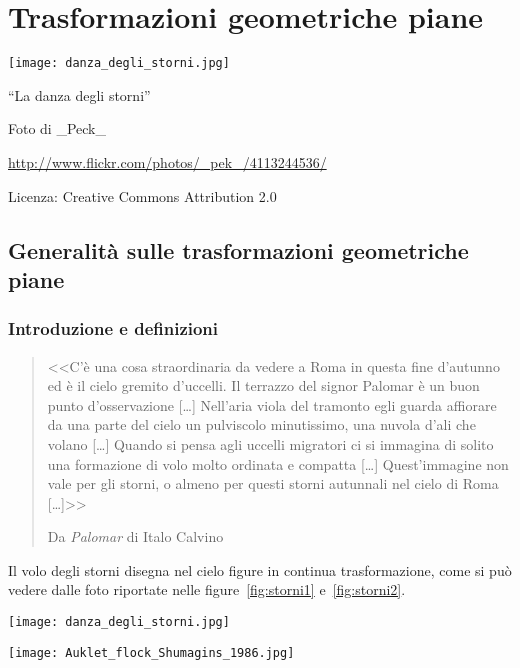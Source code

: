 
\chapter{Trasformazioni geometriche piane}\label{chap:trasformazioni}

\texttt{[image: danza\_degli\_storni.jpg]}
  \begin{center}
    {\large ``La danza degli storni''}\par
    Foto di \_Peck\_\par
    \url{http://www.flickr.com/photos/_pek_/4113244536/}\par
    Licenza: Creative Commons Attribution 2.0\par
  \end{center}
\newpage


\section{Generalità sulle trasformazioni geometriche piane}\label{sect:generalita_trasformazioni}

\subsection{Introduzione e definizioni}

\begin{quote}
<<C'è una cosa straordinaria da vedere a Roma in questa fine d'autunno ed è il cielo gremito d'uccelli. Il terrazzo del signor Palomar è un buon punto d'osservazione [\ldots{}] Nell'aria viola del tramonto egli guarda affiorare da una parte del cielo un pulviscolo minutissimo, una nuvola d'ali che volano [\ldots{}] Quando si pensa agli uccelli migratori ci si immagina di solito una formazione di volo molto ordinata e compatta [\ldots{}] Quest'immagine non vale per gli storni, o almeno per questi storni autunnali nel cielo di Roma [\ldots{}]>>

\hfill{}Da \emph{Palomar} di Italo Calvino
\end{quote}

Il volo degli storni disegna nel cielo figure in continua trasformazione, come si può vedere dalle foto riportate nelle figure~\ref{fig:storni1} e~\ref{fig:storni2}.

\begin{figure*}[!htb]
\begin{center}
	\noindent\begin{minipage}{0.485\textwidth}
		\centering
		\texttt{[image: danza\_degli\_storni.jpg]}
		\caption{\emph{La danza degli storni}
			\protect\footnotemark}\label{fig:storni1}
	\end{minipage}
	\hspace{2mm}	
	\noindent\begin{minipage}{0.47\textwidth}
		\centering
		\texttt{[image: Auklet\_flock\_Shumagins\_1986.jpg]}
		\caption{\emph{Auklet flock, Shumagins 1986}\protect\footnotemark
			}\label{fig:storni2}
	\end{minipage}
\end{center}
\end{figure*}

